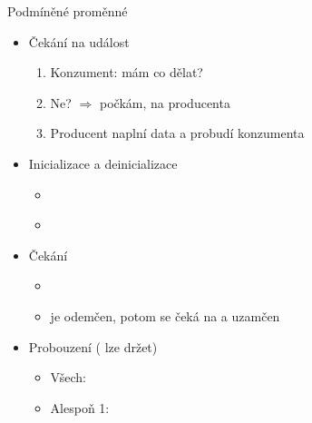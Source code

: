 \begin{frame}{Podmíněné proměnné}

  \begin{itemize}
    \item Čekání na událost
    \begin{enumerate}
      \item Konzument: mám co dělat?
      \item Ne? $\Rightarrow$ počkám, na producenta
      \item Producent naplní data a probudí konzumenta
    \end{enumerate}

    \pause

    \item Inicializace a deinicializace 
    \begin{itemize}
      \item {}\\
      \item {}
    \end{itemize}

    \pause

    \item Čekání
    \begin{itemize}
      \item {}
      \item {} je odemčen, potom se čeká na  a uzamčen
    \end{itemize}

    \pause

    \item Probouzení ( lze držet)
    \begin{itemize}
      \item Všech: 
      \item Alespoň 1: 
    \end{itemize}
  \end{itemize}

\end{frame}

